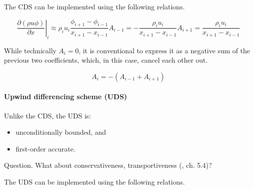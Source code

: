 \documentclass[12pt]{article}
\begin{document}
The CDS can be implemented using the following relations.

\begin{subequations}

\begin{equation}
    \left. \frac{\partial (\rho u \phi)}{\partial x} \right|_{i} \approx \rho_i u_i \frac{\phi_{i+1} - \phi_{i-1}}{x_{i+1} - x_{i-1}}
\end{equation}

\begin{equation}
    A_{i-1} = - \frac{\rho_i u_i}{x_{i+1} - x_{i-1}}
\end{equation}

\begin{equation}
    A_{i+1} = \frac{\rho_i u_i}{x_{i+1} - x_{i-1}}
\end{equation}

\end{subequations}

While technically $A_i = 0$, it is conventional to express it as a negative sum of the previous two coefficients, which, in this case, cancel each other out.

\begin{equation}
    A_{i} = - \left( A_{i-1} + A_{i+1} \right)
\end{equation}


\paragraph{Upwind differencing scheme (UDS)}

Unlike the CDS, the UDS is:

\begin{itemize}
    \item unconditionally bounded, and
    \item first-order accurate.
\end{itemize}

Question. What about conservativeness, transportiveness (\textcite{VerMalCFD}, ch. 5.4)?

The UDS can be implemented using the following relations.
\end{document}
